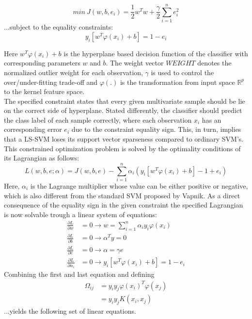 \documentclass[preprint,12pt]{elsarticle}
\begin{document}
\begin{equation}
min \  J(w,b,e_i) = \frac{1}{2} w^T w + \frac{\gamma}{2} \sum_{i=1}^{n} e_i^2
\label{eq:costfunction}
\end{equation}
...subject to the equality constraints:
\begin{equation}
y_i[w^T \varphi(x_i) + b] = 1-e_i
\label{eq:lsconstraint}
\end{equation}

Here $w^T \varphi(x_i) + b$ is the hyperplane based decision function of the classifier with corresponding parameters $w$ and $b$. The weight vector $WEIGHT$ denotes the normalized outlier weight for each observation, $\gamma$ is used to control the over/under-fitting trade-off and $\varphi(.)$ is the transformation from input space $\mathbb{R}^p$ to the kernel feature space. \\

The specified constraint states that every given multivariate sample should be lie on the correct side of hyperplane. Stated differently, the classifier should predict the class label of each sample correctly, where each observation $x_i$ has an corresponding error $e_i$ due to the constraint equality sign. This, in turn, implies that a LS-SVM loses its support vector sparseness compared to ordinary SVM's. \\

This constrained optimization problem is solved by the optimality conditions of its Lagrangian as follows:
\begin{equation}
L(w,b,e;\alpha) = J(w,b,e) - \sum_{i=1}^{n} \alpha_i(y_i [ w^T \varphi(x_i) + b]-1 + e_i)
\label{eq:lagrangian}
\end{equation}
Here, $\alpha_i$ is the Lagrange multiplier whose value can be either positive or negative, which is also different from the standard SVM proposed by Vapnik. 
As a direct consequence of the equality sign in the given constraint the specified Lagrangian is now solvable trough a linear system of equations:
\begin{align}
\frac{\partial L}{\partial w} &= 0 \rightarrow w = \sum_{i=1}^{n} \alpha_i y_i \varphi(x_i) \\
\frac{\partial L}{\partial b} &= 0 \rightarrow \alpha^T y = 0 \\
\frac{\partial L}{\partial e} &= 0 \rightarrow \alpha = \gamma e \\
\frac{\partial L}{\partial \alpha_i} &= 0 \rightarrow y_i [w^T \varphi(x_i) + b ] = 1 - e_i 	
\end{align}
Combining the first and last equation and defining 
\begin{align}
\Omega_{ij} &= y_i y_j \varphi(x_i)^T \varphi(x_j) \\
&= y_i y_j K(x_i, x_j)
\end{align}
...yields the following set of linear equations.
\end{document}
